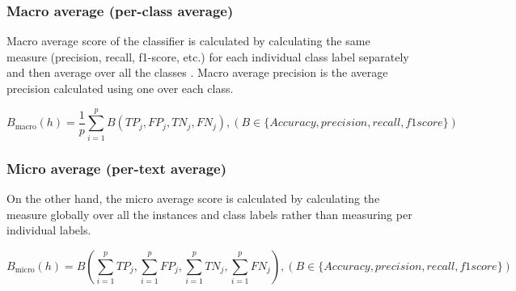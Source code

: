 \subsubsection{Macro average (per-class average)}
Macro average score of the classifier is calculated by calculating the same measure (precision, recall, f1-score, etc.) for each individual class label separately and then average over all the classes \cite{sorower2010literature}. Macro average precision is the average precision calculated using one over each class. 

$$B_\mathrm{macro}(h) = \frac{1}{p}\sum_{i =1}^{p}B(TP_j,FP_j,TN_j,FN_j), (B\in \{Accuracy,precision,recall,f1score\})$$ \cite{zhang2010multi}



\subsubsection{Micro average (per-text average)}
On the other hand, the micro average score is calculated by calculating the measure globally over all the instances and class labels rather than measuring per individual labels.\cite{zhang2010multi}

$$B_\mathrm{micro}(h) = B\left(\sum_{i =1}^{p}TP_j,\sum_{i =1}^{p}FP_j,\sum_{i =1}^{p}TN_j,\sum_{i =1}^{p}FN_j\right), (B\in \{Accuracy,precision,recall,f1score\})$$ \cite{zhang2010multi}